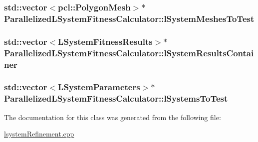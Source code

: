 \hypertarget{classParallelizedLSystemFitnessCalculator_ad8eff5943f0da001ab54efe575c14f3b}{
\subsubsection[{l\-System\-Meshes\-To\-Test}]{\setlength{\rightskip}{0pt plus 5cm}std\-::vector$<$pcl\-::\-Polygon\-Mesh$>$$\ast$ Parallelized\-L\-System\-Fitness\-Calculator\-::l\-System\-Meshes\-To\-Test}}\label{classParallelizedLSystemFitnessCalculator_ad8eff5943f0da001ab54efe575c14f3b}
\hypertarget{classParallelizedLSystemFitnessCalculator_ac12326eda28a925883fe7ec78b61d6f8}{
\subsubsection[{l\-System\-Results\-Container}]{\setlength{\rightskip}{0pt plus 5cm}std\-::vector$<${\bf L\-System\-Fitness\-Results}$>$$\ast$ Parallelized\-L\-System\-Fitness\-Calculator\-::l\-System\-Results\-Container}}\label{classParallelizedLSystemFitnessCalculator_ac12326eda28a925883fe7ec78b61d6f8}
\hypertarget{classParallelizedLSystemFitnessCalculator_ad6da0730abb54dc15d9f8c3d7c076c35}{
\subsubsection[{l\-Systems\-To\-Test}]{\setlength{\rightskip}{0pt plus 5cm}std\-::vector$<${\bf L\-System\-Parameters}$>$$\ast$ Parallelized\-L\-System\-Fitness\-Calculator\-::l\-Systems\-To\-Test}}\label{classParallelizedLSystemFitnessCalculator_ad6da0730abb54dc15d9f8c3d7c076c35}


The documentation for this class was generated from the following file\-:\begin{DoxyCompactItemize}
\item 
\hyperlink{lsystemRefinement_8cpp}{lsystem\-Refinement.\-cpp}\end{DoxyCompactItemize}

